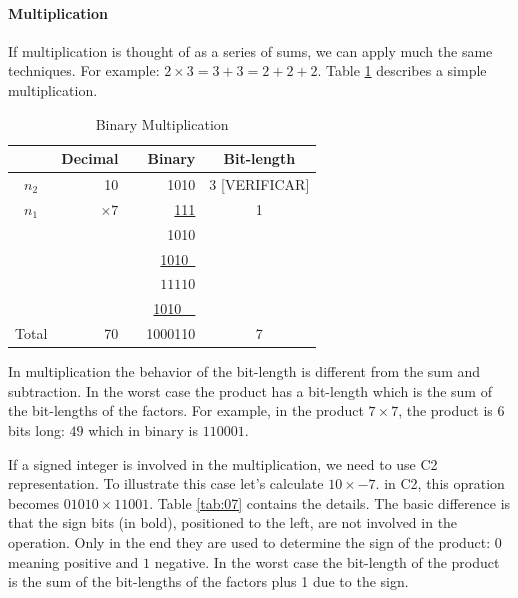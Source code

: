 \documentclass[12pt]{article}
\begin{document}
\paragraph{Multiplication}
If multiplication is thought of as a series of sums, we can apply much the same
techniques. For example: $2 \times 3 = 3 + 3 = 2 + 2 + 2$. Table \ref{tab:06}
describes a simple multiplication.

\begin{table}[ht]
	\centering
    \caption{Binary Multiplication}
    \begin{tabular}{crrrc}
    \hline
    	  & Decimal & & Binary & Bit-length \\
    \hline      
    $n_2$ & 10	& & 1010 & 3 [VERIFICAR]\\
    $n_1$ & \underline{$\times 7$} & & \underline{111} & 1 \\
    & & & 1010  & \\
    & & & \underline{1010\ } & \\
    & & & $11110$ & \\
    & & & \underline{1010\ \ } & \\
    Total& 70 & & 1000110 & 7\\
    \hline
	\end{tabular}
    \label{tab:06}
\end{table}

In multiplication the behavior of the bit-length is different from the sum and
subtraction. In the worst case the product has a bit-length which is the sum of
the bit-lengths of the factors. For example, in the product $7\times7$, the
product is 6 bits long: $49$ which in binary is $110001$.

If a signed integer is involved in the multiplication, we need to use C2
representation. To illustrate this case let's calculate $10\times-7$. in C2,
this opration becomes $01010\times11001$. Table \ref{tab:07} contains the
details. The basic difference is that the sign bits (in bold), positioned to
the left, are not involved in the operation. Only in the end they are used to
determine the sign of the product: $0$ meaning positive and $1$ negative. In
the worst case the bit-length of the product is the sum of the bit-lengths of
the factors plus 1 due to the sign.
\end{document}
